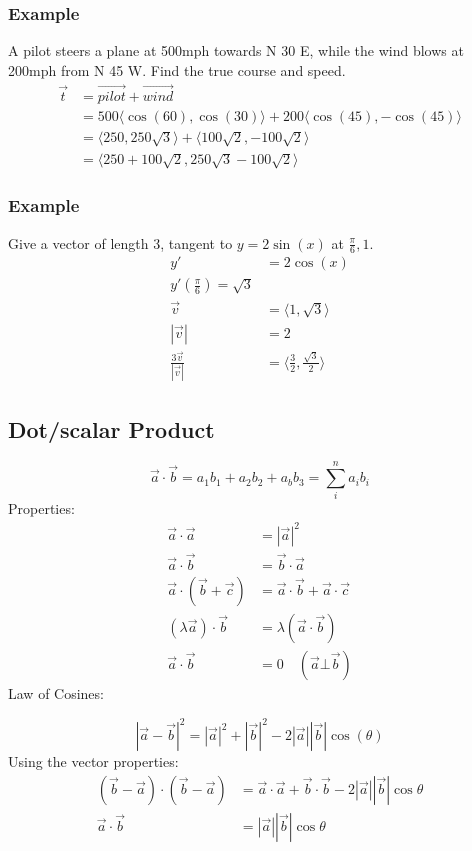\documentclass[letterpaper, 12pt]{math}
\begin{document}
\subsubsection*{Example}
A pilot steers a plane at 500mph towards N 30 E, while the wind blows at 200mph
from N 45 W. Find the true course and speed.
\begin{align*}
  \vec{t} &= \overrightarrow{pilot}+\overrightarrow{wind} \\
  &= 500\langle\cos(60),\cos(30)\rangle+200\langle\cos(45),-\cos(45)\rangle \\
  &= \langle250,250\sqrt{3}\rangle+\langle100\sqrt{2},-100\sqrt{2}\rangle \\
  &= \langle250+100\sqrt{2},250\sqrt{3}-100\sqrt{2}\rangle
\end{align*}

\subsubsection*{Example}
Give a vector of length 3, tangent to \( y = 2\sin(x) \) at
\( \frac{\pi}{6},1 \).
\begin{align*}
  y' &= 2\cos(x) \\
  y'(\frac{\pi}{6}) = \sqrt{3} \\
  \vec{v} &= \langle1,\sqrt{3}\rangle \\
  |\vec{v}| &= 2 \\
  \frac{3\vec{v}}{|\vec{v}|} &= \langle\frac{3}{2},\frac{\sqrt{3}}{2}\rangle
\end{align*}

\subsection*{Dot/scalar Product}
\[ \vec{a}\cdot\vec{b} = a_{1}b_{1}+a_{2}b_{2}+a_{b}b_{3} =
   \sum_{i}^{n}a_{i}b_{i} \]
Properties:
\begin{align*}
  \vec{a}\cdot\vec{a} &= |\vec{a}|^{2} \\
  \vec{a}\cdot\vec{b} &= \vec{b}\cdot\vec{a} \\
  \vec{a}\cdot(\vec{b}+\vec{c}) &= \vec{a}\cdot\vec{b}+\vec{a}\cdot\vec{c} \\
  (\lambda\vec{a})\cdot\vec{b} &= \lambda(\vec{a}\cdot\vec{b}) \\
  \vec{a}\cdot\vec{b} &= 0 \quad (\vec{a}\bot\vec{b})
\end{align*}
Law of Cosines:
\begin{center}
\end{center}
\[ |\vec{a}-\vec{b}|^{2} = |\vec{a}|^{2}+|\vec{b}|^{2}-
  2|\vec{a}||\vec{b}|\cos(\theta) \]
Using the vector properties:
\begin{align*}
  (\vec{b}-\vec{a})\cdot(\vec{b}-\vec{a}) &=
    \vec{a}\cdot\vec{a}+\vec{b}\cdot\vec{b}-2|\vec{a}||\vec{b}|\cos\theta \\
  \vec{a}\cdot\vec{b} &= |\vec{a}||\vec{b}|\cos\theta
\end{align*}
\end{document}
